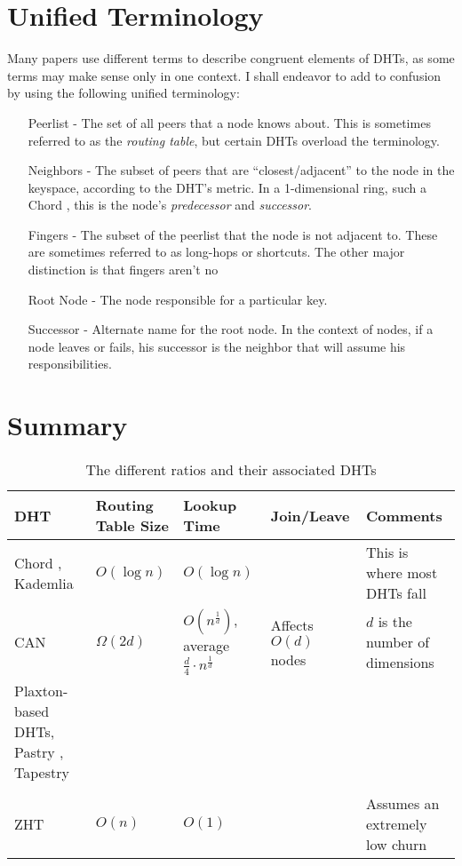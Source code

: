 \documentclass[10pt,letterpaper,twoside]{report}
\begin{document}
\section{Unified Terminology}
Many papers use different terms to describe congruent elements of DHTs, as some terms may make sense only in one context.
I shall endeavor to add to confusion by using the following unified terminology:
\begin{enumerate}
	\item[Peerlist] -  The set of all peers that a node knows about.  This is sometimes referred to as the \textit{routing table}, but certain DHTs \cite{tapestry} \cite{pastry} overload the terminology.
	\item[Neighbors] - The subset of peers that are ``closest/adjacent'' to the node in the keyspace, according to the DHT's metric.  In a 1-dimensional ring, such a Chord \cite{chord}, this is the node's \textit{predecessor} and \textit{successor}.
	\item[Fingers] - The subset of the peerlist that the node is not adjacent to.  These are sometimes referred to as long-hops or shortcuts. The other major distinction is that fingers aren't no
	\item[Root Node] - The node responsible for a particular key. 
	\item[Successor] -  Alternate name for the root node. 
	In the context of nodes, if a node leaves or fails, his successor is the neighbor that will assume his responsibilities. 
\end{enumerate}


\section{Summary}

\begin{table}[h]
	\small
	\centering
	\begin{tabularx}{\textwidth}{ |X|X|X|X|X| }
		\hline
		DHT & Routing Table Size & Lookup Time & Join/Leave & Comments \\ \hline  
		Chord \cite{chord}, Kademlia \cite{kademlia} & $O(\log n)$ & $O(\log n)$ & & This is where most DHTs fall  \\ \hline
		CAN \cite{can} & $\Omega(2d)$ & $O(n^{\frac{1}{d}})$, average $\frac{d}{4}\cdot n^{\frac{1}{d}}$ & Affects $O(d)$ nodes & $d$ is the number of dimensions \\ \hline
		
		Plaxton-based DHTs, Pastry \cite{pastry}, Tapestry \cite{tapestry} &  & & & \\ \hline
		& & & & \\ \hline  
		ZHT \cite{li2013zht}&   $O(n)$& $O(1)$ &  &Assumes an extremely low churn \\ \hline
	\end{tabularx}
	\caption{The different ratios and their associated DHTs}
	\label{tab:tradeoffs}
\end{table}
\end{document}
